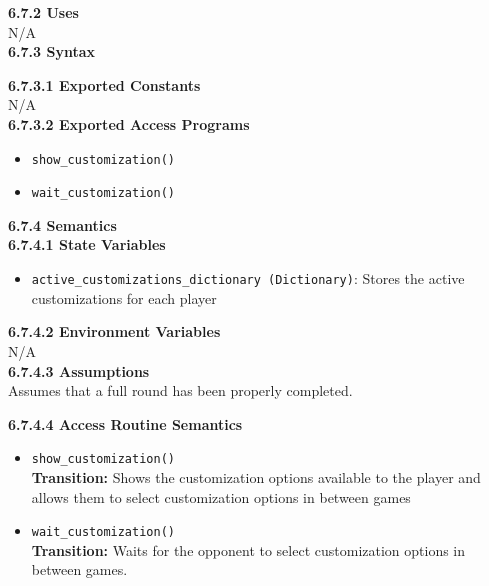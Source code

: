 \documentclass[12pt, titlepage]{article}
\begin{document}
\noindent \textbf{6.7.2 Uses}\\
N/A \\

\noindent \textbf{6.7.3 Syntax}

\noindent \textbf{6.7.3.1 Exported Constants}\\
N/A\\

\textbf{6.7.3.2 Exported Access Programs}
\begin{itemize}
	\item \texttt{show\_customization()}
	\item \texttt{wait\_customization()}
	
	
\end{itemize}

\noindent \textbf{6.7.4 Semantics}\\
\textbf{6.7.4.1 State Variables}\\

\begin{itemize}
    \item \texttt{active\_customizations\_dictionary (Dictionary)}: Stores the active customizations for each player 

\end{itemize}

\textbf{6.7.4.2 Environment Variables}\\

N/A\\



\textbf{6.7.4.3 Assumptions}\\
Assumes that a full round has been properly completed.

\textbf{6.7.4.4 Access Routine Semantics}
\begin{itemize}

	\item \texttt{show\_customization()}\\
	\textbf{Transition:} Shows the customization options available to the player and allows them to select customization options in between games
	
	\item \texttt{wait\_customization()}\\
	\textbf{Transition:} Waits for the opponent to select customization options in between games.
	
	


\end{itemize}
\end{document}
